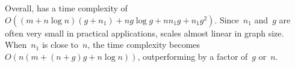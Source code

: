 Overall, \Improved has a time complexity of $O((m+n\log{n})(g+n_1)+ng\log g+nn_1g+n_1g^2)$.
Since~$n_1$ and~$g$ are often very small in practical applications, \Improved scales almost linear in graph size. When~$n_1$ is close to~$n$, the time complexity becomes $O(n(m+(n+g)g+n\log n))$, outperforming \Basic by a factor of~$g$ or~$n$.


    
    
    
